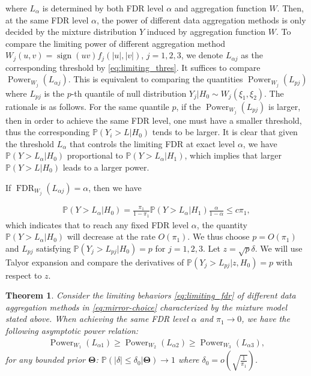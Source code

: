\documentclass[12pt]{article}
\newcommand{\abs}[1]{\left\lvert#1\right\rvert}
\newcommand{\PP}{\mathbb{P}}
\def\PP{{\mathbb P}}
\newtheorem{Theorem}{Theorem}
\theoremstyle{plain}
\begin{document}
where $L_\alpha$ is determined by both FDR level $\alpha$ and aggregation function $W$. Then, at the same FDR level $\alpha$, the power of different data aggregation methods is only decided by the mixture distribution $Y$ induced by aggregation function $W$. To compare the limiting power of different aggregation method $W_j(u,v) = \operatorname{sign}(u v )f_j(\abs{u},\abs{v} )$, $j=1,2,3$, we denote $L_{\alpha j} $ as the corresponding threshold by \eqref{eq:limiting_thres}. It suffices to compare $\operatorname{Power}_{W_j}(L_{\alpha j} )$. This is equivalent to comparing the quantities $\operatorname{Power}_{W_j}(L_{p j} )$ where $L_{p j}$ is the $p$-th quantile of  null distribution $Y_j|H_0\sim W_j(\xi_1,\xi_2)$. The rationale is as follows. For the same quantile $p$, if the $\operatorname{Power}_{W_j}(L_{p j} )$ is larger, then in order to achieve the same FDR level, one must have a smaller threshold, thus the corresponding $\PP(Y_i>L |H_0) $ tends to be larger. It is clear that given the threshold $L_\alpha$ that controls the limiting FDR at exact level $\alpha$, we have $\PP(Y>L_\alpha |H_0) $ proportional to  $\PP(Y>L_\alpha |H_1) $, which implies that larger $\PP(Y>L |H_0) $  leads to a larger power.

If  $\operatorname{FDR}_{W_j}(L_{\alpha j} ) = \alpha $, then we have

\begin{equation*}
	\begin{aligned}
		\PP(Y>L_\alpha|H_0) =  \frac{\pi_1}{1-\pi_1} \PP(Y>L_\alpha|H_1)\frac{\alpha}{1-\alpha}\le c \pi_1,
	\end{aligned}
\end{equation*}
which indicates that to reach any fixed FDR level $\alpha$, the quantity $\PP(Y>L_\alpha|H_0)$ will decrease at the rate $O(\pi_1)$. We thus choose $p = O(\pi_1)$ and $L_{p j}$ satisfying $ \PP(Y_j>L_{p j}|H_0) = p$ for $j=1,2,3$. Let $z= \sqrt{p} \delta$. We will use Talyor expansion and compare the derivatives of $ \PP(Y_j>L_{p j}|z,H_0) = p$ with respect to $z$.

\begin{Theorem}\label{thm:power-comparison}
	Consider the limiting behaviors \eqref{eq:limiting_fdr} of different data aggregation methods in \eqref{eq:mirror-choice} characterized by the mixture model stated above. When achieving the same FDR level $\alpha$ and $\pi_1\to 0$, we have the following asymptotic power relation:	
	\begin{equation*}
		\begin{aligned}
			\operatorname{Power}_{W_1}(L_{\alpha 1} )\ge \operatorname{Power}_{W_2}(L_{\alpha 2} ) \ge \operatorname{Power}_{W_3}(L_{\alpha 3} ),
		\end{aligned}
	\end{equation*}
	for any bounded prior $\mathbf{\Theta} $: $\PP( \abs{\delta}\le \delta_0|\mathbf{\Theta}  )\to 1$ where $\delta_0 = o(\sqrt{\frac{1}{\pi_1}})$.
\end{Theorem}
\end{document}
